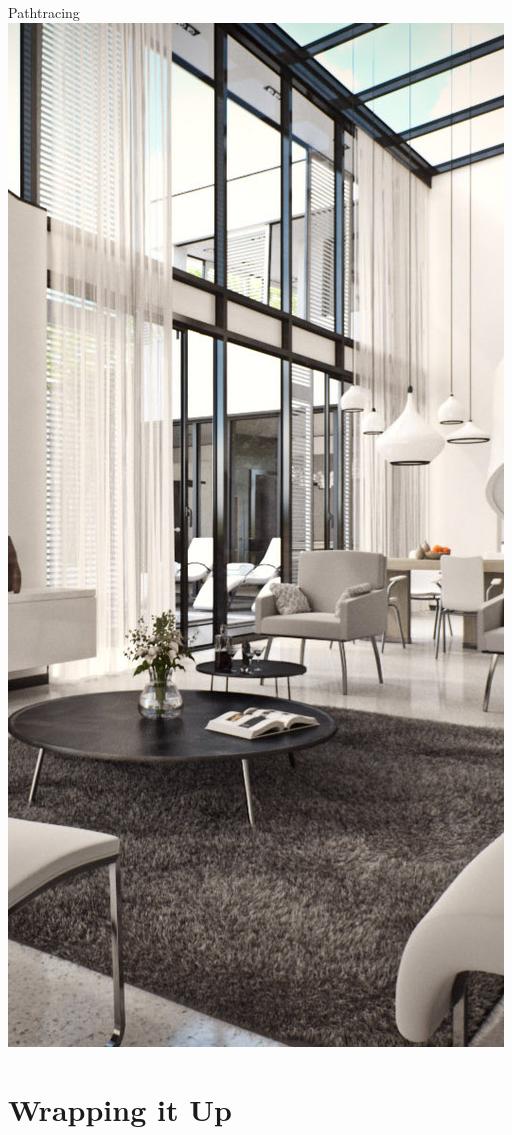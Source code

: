 \documentclass{lug}
\begin{document}
\begin{frame}{Pathtracing}
{    }{
        \includegraphics[width=\textwidth]{graphics/loungeroom}
    }
    \noindent
\end{frame}

\section{Wrapping it Up}
\end{document}
